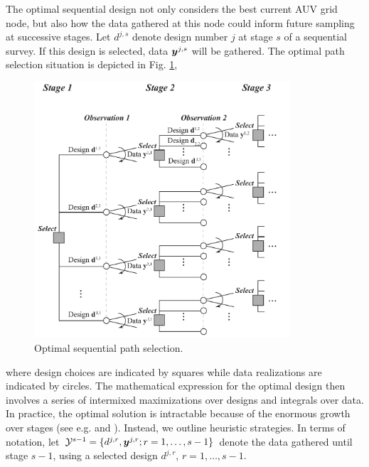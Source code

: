 \documentclass[aoas]{imsart}
\begin{document}
The optimal sequential design not only considers the best current AUV
grid node, but also how the data gathered at this node could inform future sampling at successive stages. Let $d^{j,s}$ denote design
number $j$ at stage $s$ of a sequential survey. If this design is
selected, data ${\boldsymbol y}^{j,s}$ will be gathered. The optimal path
selection situation is  depicted in Fig. \ref{fig:PathSelOpt},
\begin{figure}[h!]
\centering
\includegraphics[width=0.85\textwidth]{Figures/sequent_select.pdf}
\caption{Optimal sequential path selection.}\label{fig:PathSelOpt}
\end{figure}
where design choices are indicated by squares while data realizations are indicated by circles. 
The mathematical expression for the optimal design then involves a
series of intermixed maximizations over designs and integrals over
data.  In practice, the optimal solution is intractable because of
the enormous growth over stages (see
e.g. \cite{sucar2015probabilistic} and \cite{powell2016perspectives}).
Instead, we outline heuristic strategies. In terms of notation, let
$\mathcal{Y}^{s-1} =\{d^{j,r}, {\boldsymbol y}^{j,r} ; r=1,\ldots,s-1 \}$ denote
the data gathered until stage $s-1$, using a selected design
$d^{j,r}$, $r=1,\ldots,s-1$.
\end{document}
